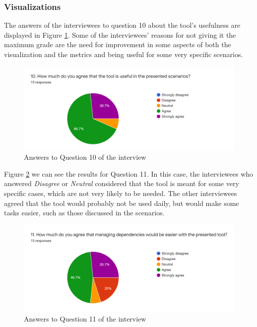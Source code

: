 \subsubsection{Visualizations}

The answers of the interviewees to question 10 about the tool's usefulness are displayed in Figure \ref{fig:interview-10}. Some of the interviewees' reasons for not giving it the maximum grade are the need for improvement in some aspects of both the visualization and the metrics and being useful for some very specific scenarios.

\begin{figure}[ht!]
\begin{center}
\includegraphics[width=\textwidth]{figures/interview/Question10.png}
\caption{Answers to Question 10 of the interview}
\label{fig:interview-10}
\end{center}
\end{figure}

Figure \ref{fig:interview-11} we can see the results for Question 11. In this case, the interviewees who answered \textit{Disagree} or \textit{Neutral} considered that the tool is meant for some very specific cases, which are not very likely to be needed. The other interviewees agreed that the tool would probably not be used daily, but would make some tasks easier, such as those discussed in the scenarios.

\begin{figure}[ht!]
\begin{center}
\includegraphics[width=\textwidth]{figures/interview/Question11.png}
\caption{Answers to Question 11 of the interview}
\label{fig:interview-11}
\end{center}
\end{figure}

